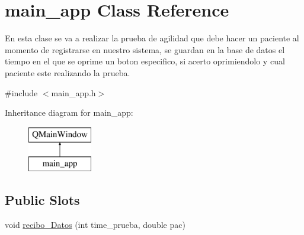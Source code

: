 \hypertarget{classmain__app}{}\section{main\+\_\+app Class Reference}
\label{classmain__app}


En esta clase se va a realizar la prueba de agilidad que debe hacer un paciente al momento de registrarse en nuestro sistema, se guardan en la base de datos el tiempo en el que se oprime un boton especifico, si acerto oprimiendolo y cual paciente este realizando la prueba.  




{\ttfamily \#include $<$main\+\_\+app.\+h$>$}

Inheritance diagram for main\+\_\+app\+:\begin{figure}[H]
\begin{center}
\leavevmode
\includegraphics[height=2.000000cm]{classmain__app}
\end{center}
\end{figure}
\subsection*{Public Slots}
\begin{DoxyCompactItemize}
\item 
void \hyperlink{classmain__app_a80f7a386d67024facffb6d1ae66c34d6}{recibo\+\_\+\+Datos} (int time\+\_\+prueba, double pac)
\end{DoxyCompactItemize}
